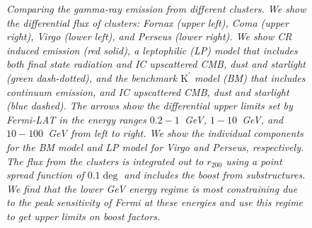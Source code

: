 \documentclass[10pt,aps,pra,reprint,amsmath,amsfonts,amssymb,showpacs,nofootinbib,floatfix]{revtex4-1}
\newcommand{\rmn}{\mathrm}
\newcommand{\Kp}{\rmn{K}^\prime}
\newcommand{\rvir}{r_{200}}
\begin{document}
\begin{figure}
\begin{minipage}{2.0\columnwidth}
\caption{\it Comparing the gamma-ray emission from different
  clusters. We show the differential flux of clusters: Fornax
  (upper left), Coma (upper right), Virgo (lower left), and Perseus
  (lower right). We show CR induced emission (red solid), a leptophilic
  (LP) model that includes both final state radiation and IC upscattered
  CMB, dust and starlight (green dash-dotted), and the benchmark $\Kp$
  model (BM) that includes continuum emission, and IC upscattered CMB, dust
  and starlight (blue dashed). The arrows show the differential upper
  limits set by Fermi-LAT in the energy ranges $0.2-1$~GeV,
  $1-10$~GeV, and $10-100$~GeV from left to right. We show the
  individual components for the BM model and LP model for Virgo and
  Perseus, respectively. The flux from the clusters is integrated out
  to $\rvir$ using a point spread function of $0.1\deg$ and includes
  the boost from substructures. We find that the lower GeV energy
  regime is most constraining due to the peak sensitivity of Fermi at
  these energies and use this regime to get upper limits on boost
  factors.}
 \label{fig:clu_comp}
\end{minipage}
\end{figure}
\end{document}
